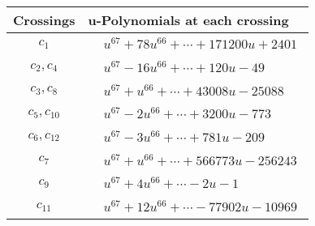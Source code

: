 \documentclass[1p]{elsarticle_modified}
\theoremstyle{definition}
\begin{document}
\begin{tabular}{m{50pt}|m{274pt}}
Crossings & \hspace{64pt}u-Polynomials at each crossing \\
\hline $$\begin{aligned}c_{1}\end{aligned}$$&$\begin{aligned}
&u^{67}+78 u^{66}+\cdots+171200 u+2401
\end{aligned}$\\
\hline $$\begin{aligned}c_{2},c_{4}\end{aligned}$$&$\begin{aligned}
&u^{67}-16 u^{66}+\cdots+120 u-49
\end{aligned}$\\
\hline $$\begin{aligned}c_{3},c_{8}\end{aligned}$$&$\begin{aligned}
&u^{67}+u^{66}+\cdots+43008 u-25088
\end{aligned}$\\
\hline $$\begin{aligned}c_{5},c_{10}\end{aligned}$$&$\begin{aligned}
&u^{67}-2 u^{66}+\cdots+3200 u-773
\end{aligned}$\\
\hline $$\begin{aligned}c_{6},c_{12}\end{aligned}$$&$\begin{aligned}
&u^{67}-3 u^{66}+\cdots+781 u-209
\end{aligned}$\\
\hline $$\begin{aligned}c_{7}\end{aligned}$$&$\begin{aligned}
&u^{67}+u^{66}+\cdots+566773 u-256243
\end{aligned}$\\
\hline $$\begin{aligned}c_{9}\end{aligned}$$&$\begin{aligned}
&u^{67}+4 u^{66}+\cdots-2 u-1
\end{aligned}$\\
\hline $$\begin{aligned}c_{11}\end{aligned}$$&$\begin{aligned}
&u^{67}+12 u^{66}+\cdots-77902 u-10969
\end{aligned}$\\
\hline
\end{tabular}\\~\\
\end{document}
